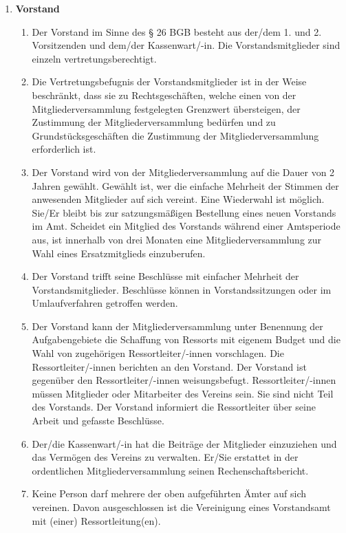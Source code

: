 \documentclass{article}
\begin{document}
\begin{enumerate}[§ 1.]
\item \textsf{\textbf{Vorstand}}
	\begin{enumerate}[1.]	
	\item Der Vorstand im Sinne des § 26 BGB besteht aus der/dem 1. und 2. Vorsitzenden und dem/der Kassenwart/-in.
	Die Vorstandsmitglieder sind einzeln vertretungsberechtigt.
	\item Die Vertretungsbefugnis der Vorstandsmitglieder ist in der Weise beschränkt, dass sie zu Rechtsgeschäften, welche einen von der Mitgliederversammlung festgelegten Grenzwert übersteigen, der Zustimmung der Mitgliederversammlung bedürfen und zu Grundstücksgeschäften die Zustimmung der Mitgliederversammlung erforderlich ist.
	\item Der Vorstand wird von der Mitgliederversammlung auf die Dauer von 2 Jahren gewählt.
	Gewählt ist, wer die einfache Mehrheit der Stimmen der anwesenden Mitglieder auf sich vereint.
	Eine Wiederwahl ist möglich. Sie/Er bleibt bis zur satzungsmäßigen Bestellung eines neuen Vorstands im Amt.
	Scheidet ein Mitglied des Vorstands während einer Amtsperiode aus,
	ist innerhalb von drei Monaten eine Mitgliederversammlung zur Wahl eines Ersatzmitglieds einzuberufen.
	\item Der Vorstand trifft seine Beschlüsse mit einfacher Mehrheit der Vorstandsmitglieder. Beschlüsse können in Vorstandssitzungen oder im Umlaufverfahren getroffen werden.
	\item Der Vorstand kann der Mitgliederversammlung unter Benennung der Aufgabengebiete die Schaffung von Ressorts mit eigenem Budget und die Wahl von zugehörigen Ressortleiter/-innen vorschlagen. Die Ressortleiter/-innen berichten an den Vorstand. Der Vorstand ist gegenüber den Ressortleiter/-innen weisungsbefugt. Ressortleiter/-innen müssen Mitglieder oder Mitarbeiter des Vereins sein. Sie sind nicht Teil des Vorstands. Der Vorstand informiert die Ressortleiter über seine Arbeit und gefasste Beschlüsse.  
	\item Der/die Kassenwart/-in hat die Beiträge der Mitglieder einzuziehen und das Vermögen des Vereins zu verwalten. Er/Sie erstattet in der ordentlichen Mitgliederversammlung seinen Rechenschaftsbericht.
	\item Keine Person darf mehrere der oben aufgeführten Ämter auf sich vereinen. Davon ausgeschlossen ist die Vereinigung eines Vorstandsamt mit (einer) Ressortleitung(en).
	\end{enumerate}


\end{enumerate}
\end{document}
